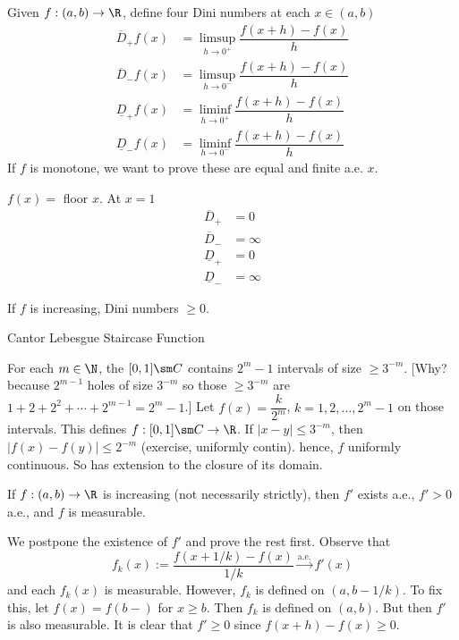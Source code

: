 Given $f: (a,b) \to \R$, define four Dini numbers at each $x \in (a,b)$
	\[
	\begin{split}
	\overline{D}_+f(x)&= \limsup_{h \to 0^+} \dfrac{f(x+h) - f(x)}{h} \\
	\overline{D}_-f(x)&= \limsup_{h \to 0^-} \dfrac{f(x+h) - f(x)}{h} \\
	\underline{D}_+f(x)&= \liminf_{h \to 0^+} \dfrac{f(x+h) - f(x)}{h} \\
	\underline{D}_-f(x)&= \liminf_{h \to 0^-} \dfrac{f(x+h) - f(x)}{h}
	\end{split}
	\]
If $f$ is monotone, we want to prove these are equal and finite a.e. $x$. 


\begin{ex}
$f(x)=$ floor $x$.
At $x=1$
	\[
	\begin{split}
	\overline{D}_+&= 0 \\
	\overline{D}_-&= \infty \\
	\underline{D}_+&= 0 \\
	\underline{D}_-&= \infty
	\end{split}
	\]
\end{ex}


If $f$ is increasing, Dini numbers $\geq 0$. 


\begin{ex}
Cantor Lebesgue Staircase Function

For each $m \in \N$, the $[0,1] \sm C$ contains $2^m-1$ intervals of size $ \geq 3^{-m}$. [Why? because $2^{m-1}$ holes of size $3^{-m}$ so those $\geq 3^{-m}$ are $1+2+2^2+\cdots+2^{m-1}= 2^m-1$.] Let $f(x)= \dfrac{k}{2^m}$, $k=1,2,\ldots,2^m-1$ on those intervals. This defines $f: [0,1] \sm C \to \R$. If $|x-y| \leq 3^{-m}$, then $|f(x)-f(y)| \leq 2^{-m}$ (exercise, uniformly contin). hence, $f$ uniformly continuous. So has extension to the closure of its domain. 
\end{ex}






\begin{thm}
If $f: (a,b) \to \R$ is increasing (not necessarily strictly), then $f'$ exists a.e., $f'>0$ a.e., and $f$ is measurable. 
\end{thm}

\pf We postpone the existence of $f'$ and prove the rest first. Observe that 
	\[
	f_k(x):= \dfrac{f(x+1/k) - f(x)}{1/k} \stackrel{\text{a.e.}}{\to} f'(x)
	\]
and each $f_k(x)$ is measurable. However, $f_k$ is defined on $(a,b-1/k)$. To fix this, let $f(x)=f(b-)$ for $x \geq b$. Then $f_k$ is defined on $(a,b)$. But then $f'$ is also measurable. It is clear that $f' \geq 0$ since $f(x+h) - f(x) \geq 0$.

